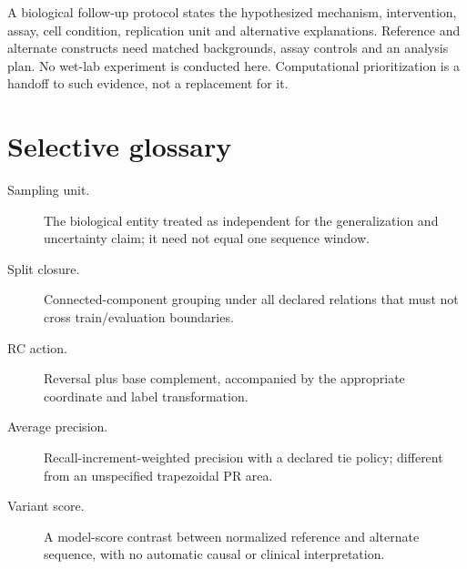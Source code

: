 A biological follow-up protocol states the hypothesized mechanism, intervention,
assay, cell condition, replication unit and alternative explanations. Reference
and alternate constructs need matched backgrounds, assay controls and an analysis
plan. No wet-lab experiment is conducted here. Computational prioritization is a
handoff to such evidence, not a replacement for it.

\section{Selective glossary}
\begin{description}
\item[Sampling unit.] The biological entity treated as independent for the
generalization and uncertainty claim; it need not equal one sequence window.
\item[Split closure.] Connected-component grouping under all declared relations
that must not cross train/evaluation boundaries.
\item[RC action.] Reversal plus base complement, accompanied by the appropriate
coordinate and label transformation.
\item[Average precision.] Recall-increment-weighted precision with a declared
tie policy; different from an unspecified trapezoidal PR area.
\item[Variant score.] A model-score contrast between normalized reference and
alternate sequence, with no automatic causal or clinical interpretation.
\end{description}

